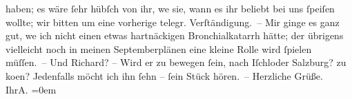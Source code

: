 \begin{ledgroupsized}[t]{13cm}
               haben; es wäre ſehr hübſch von ihr, we{\geminationn}{ }sie, wann es ihr beliebt bei uns ſpeiſen wollte;
               wir bitten um eine vorherige telegr. Verſtändigung. –\pend
           \pstart
           Mir ginge es ganz gut, we{\geminationn} ich nicht einen etwas
               hartnäckigen Bronchialkatarrh hätte; der übrigens vielleicht noch in meinen
                  Septemberplänen eine kleine Rolle wird ſpielen müſſen. –\pend
           \pstart
           {\pb}Und Richard? –
               Wird er zu bewegen ſein, nach Iſchl\introOben{}oder Salzburg?\introOben{} zu ko{\geminationm}en? Jedenfalls möcht ich ihn ſehn – ſein Stück hören. –\pend
           \pstart
           Herzliche Grüße.{\\[\baselineskip]}Ihr\spacefill\mbox{A.}\pend
           \leftskip=0em{}
         
         \endnumbering{}\end{ledgroupsized}  \newcommand{\dateiname}{L01432}\newcommand{\titel}{Arthur Schnitzler an Hugo von Hofmannsthal, [24. 8. 1904]}\newcommand{\editorInnen}{Martin Anton Müller und Gerd-Hermann Susen}
      